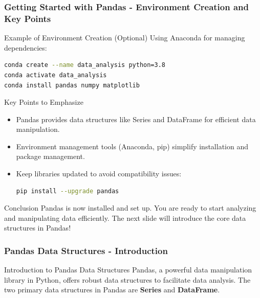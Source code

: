 \documentclass{beamer}
\begin{document}
\begin{frame}[fragile]
    \frametitle{Getting Started with Pandas - Environment Creation and Key Points}
    \begin{block}{Example of Environment Creation (Optional)}
        Using Anaconda for managing dependencies:
        \begin{lstlisting}[language=bash]
conda create --name data_analysis python=3.8
conda activate data_analysis
conda install pandas numpy matplotlib
        \end{lstlisting}
    \end{block}

    \begin{block}{Key Points to Emphasize}
        \begin{itemize}
            \item Pandas provides data structures like Series and DataFrame for efficient data manipulation.
            \item Environment management tools (Anaconda, pip) simplify installation and package management.
            \item Keep libraries updated to avoid compatibility issues:
            \begin{lstlisting}[language=bash]
pip install --upgrade pandas
            \end{lstlisting}
        \end{itemize}
    \end{block}

    \begin{block}{Conclusion}
        Pandas is now installed and set up. You are ready to start analyzing and manipulating data efficiently. The next slide will introduce the core data structures in Pandas!
    \end{block}
\end{frame}

\begin{frame}[fragile]
    \frametitle{Pandas Data Structures - Introduction}
    \begin{block}{Introduction to Pandas Data Structures}
        Pandas, a powerful data manipulation library in Python, offers robust data structures to facilitate data analysis. The two primary data structures in Pandas are \textbf{Series} and \textbf{DataFrame}.
    \end{block}
\end{frame}
\end{document}

